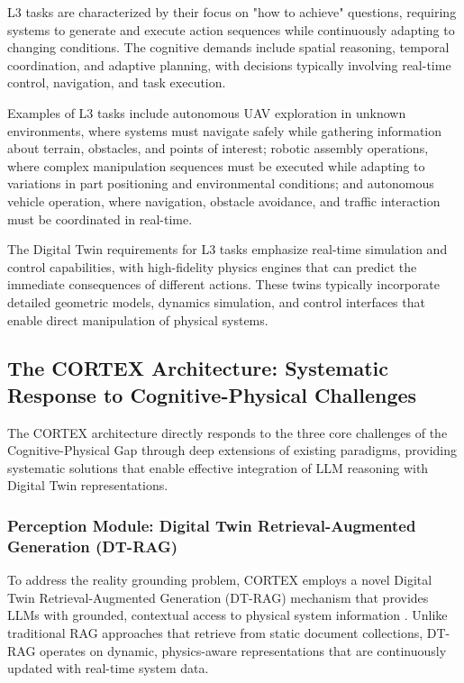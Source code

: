 L3 tasks are characterized by their focus on "how to achieve" questions, requiring systems to generate and execute action sequences while continuously adapting to changing conditions. The cognitive demands include spatial reasoning, temporal coordination, and adaptive planning, with decisions typically involving real-time control, navigation, and task execution.

Examples of L3 tasks include autonomous UAV exploration in unknown environments, where systems must navigate safely while gathering information about terrain, obstacles, and points of interest; robotic assembly operations, where complex manipulation sequences must be executed while adapting to variations in part positioning and environmental conditions; and autonomous vehicle operation, where navigation, obstacle avoidance, and traffic interaction must be coordinated in real-time.

The Digital Twin requirements for L3 tasks emphasize real-time simulation and control capabilities, with high-fidelity physics engines that can predict the immediate consequences of different actions. These twins typically incorporate detailed geometric models, dynamics simulation, and control interfaces that enable direct manipulation of physical systems.

\subsection{The CORTEX Architecture: Systematic Response to Cognitive-Physical Challenges}

The CORTEX architecture directly responds to the three core challenges of the Cognitive-Physical Gap through deep extensions of existing paradigms, providing systematic solutions that enable effective integration of LLM reasoning with Digital Twin representations.

\subsubsection{Perception Module: Digital Twin Retrieval-Augmented Generation (DT-RAG)}

To address the reality grounding problem, CORTEX employs a novel Digital Twin Retrieval-Augmented Generation (DT-RAG) mechanism that provides LLMs with grounded, contextual access to physical system information \cite{lewis2020retrieval, gao2023retrieval}. Unlike traditional RAG approaches that retrieve from static document collections, DT-RAG operates on dynamic, physics-aware representations that are continuously updated with real-time system data.

